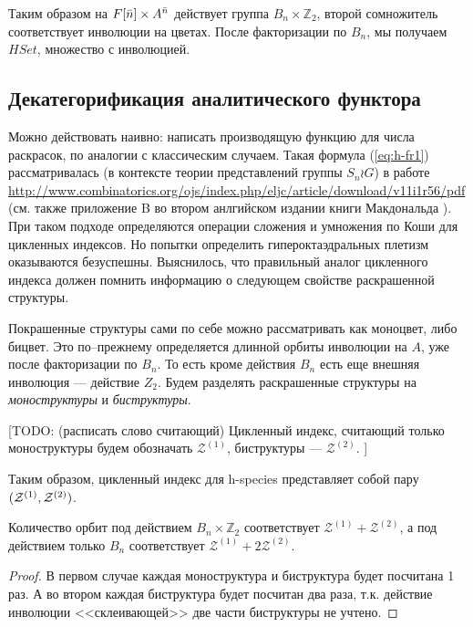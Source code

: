 Таким образом на $F[\Bar n] \times A^{\Bar n}$ действует группа $B_n \times
\mathbb Z_2$, второй сомножитель соответствует инволюции на цветах. После
факторизации по $B_n$, мы получаем $HSet$, множество с инволюцией.



\subsection{Декатегорификация аналитического функтора} 
Можно действовать наивно: написать производящую функцию для числа раскрасок, по
аналогии с классическим случаем. Такая формула (\ref{eq:h-fr1}) рассматривалась
(в контексте теории представлений группы $S_n \wr G$) в работе
\url{http://www.combinatorics.org/ojs/index.php/eljc/article/download/v11i1r56/pdf}
(см. также приложение B во втором анлгийском издании книги Макдональда
\cite{Mac2}). При таком подходе определяются операции сложения и умножения
по Коши для цикленных индексов. Но попытки определить
гипероктаэдральных плетизм оказываются безуспешны. Выяснилось, что правильный аналог цикленного
индекса должен помнить информацию о следующем свойстве раскрашенной структуры.

Покрашенные структуры сами по себе можно рассматривать как моноцвет, либо
бицвет. Это по--прежнему определяется длинной орбиты инволюции на $A$, уже
после факторизации по $B_n$. То есть кроме действия $B_n$ есть еще внешняя
инволюция --- действие $Z_2$. Будем разделять раскрашенные структуры на
\emph{моноструктуры} и \emph{биструктуры}.

[TODO: (расписать слово считающий) Цикленный индекс, считающий только
моноструктуры будем обозначать $\mathcal Z^{(1)}$, биструктуры --- $\mathcal Z^{(2)}$. ]

\begin{remark}
Таким образом, цикленный индекс для h-species представляет собой пару $(\mathcal Z^{(1)},
\mathcal Z^{(2)})$.
\end{remark}
\begin{statement}
Количество орбит под действием $B_n \times \mathbb Z_2$ соответствует $\mathcal
Z^{(1)} + \mathcal Z^{(2)}$, а под действием только $B_n$ соответствует $\mathcal Z^{(1)} + 2\mathcal
Z^{(2)}$. 
\end{statement}
\begin{proof}
В первом случае каждая моноструктура и биструктура будет посчитана 1 раз.
А во втором каждая биструктура будет посчитан два раза, т.к. действие инволюции
<<склеивающей>> две части биструктуры не учтено.
\end{proof}

